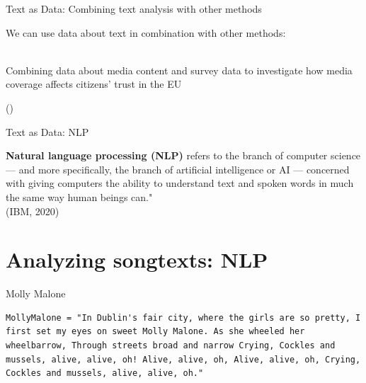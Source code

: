\documentclass[handout]{beamer}
\begin{document}
\begin{frame}{Text as Data: \small{Combining text analysis with other methods}}
	
	We can use data about text in combination with other methods: \\~
	
	Combining data about media content and survey data to investigate how media coverage affects citizens' trust in the EU \\
	\begin{tiny}
		(\cite{brosius_trust_2019}) \\
	\end{tiny}
	
	
	
\end{frame}


\begin{frame}{Text as Data: NLP}
	
	\textbf{Natural language processing (NLP)} refers to the branch of computer science — and more specifically, the branch of artificial intelligence or AI — concerned with giving computers the ability to understand text and spoken words in much the same way human beings can."  \\
	\tiny{(IBM, 2020)}
	
	
	
\end{frame}





\section{Analyzing songtexts: NLP}

\begin{frame}[fragile]{Molly Malone}
	
\begin{lstlisting} 
MollyMalone = "In Dublin's fair city, where the girls are so pretty, I first set my eyes on sweet Molly Malone. As she wheeled her wheelbarrow, Through streets broad and narrow Crying, Cockles and mussels, alive, alive, oh! Alive, alive, oh, Alive, alive, oh, Crying, Cockles and mussels, alive, alive, oh."  
\end{lstlisting}
	


\end{frame}
\end{document}
